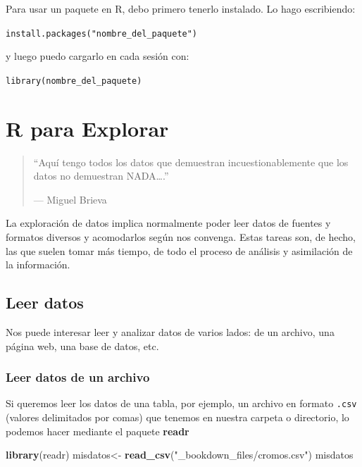 \documentclass[]{book}
\newenvironment{Shaded}{\begin{snugshade}}{\end{snugshade}}
\newcommand{\KeywordTok}[1]{\textcolor[rgb]{0.13,0.29,0.53}{\textbf{{#1}}}}
\newcommand{\StringTok}[1]{\textcolor[rgb]{0.31,0.60,0.02}{{#1}}}
\newcommand{\NormalTok}[1]{{#1}}
\theoremstyle{definition}
\theoremstyle{definition}
\theoremstyle{remark}
\begin{document}
Para usar un paquete en R, debo primero tenerlo instalado. Lo hago
escribiendo:

\texttt{install.packages("nombre\_del\_paquete")}

y luego puedo cargarlo en cada sesión con:

\texttt{library(nombre\_del\_paquete)}

\chapter{R para Explorar}\label{r-para-explorar}

\begin{quote}
``Aquí tengo todos los datos que demuestran incuestionablemente que los
datos no demuestran NADA\ldots{}.''

--- Miguel Brieva
\end{quote}

La exploración de datos implica normalmente poder leer datos de fuentes
y formatos diversos y acomodarlos según nos convenga. Estas tareas son,
de hecho, las que suelen tomar más tiempo, de todo el proceso de
análisis y asimilación de la información.

\section{Leer datos}\label{leer-datos}

Nos puede interesar leer y analizar datos de varios lados: de un
archivo, una página web, una base de datos, etc.

\subsection{Leer datos de un archivo}\label{leer-datos-de-un-archivo}

Si queremos leer los datos de una tabla, por ejemplo, un archivo en
formato \texttt{.csv} (valores delimitados por comas) que tenemos en
nuestra carpeta o directorio, lo podemos hacer mediante el paquete
\textbf{readr} \citep{R-readr}

\begin{Shaded}
\begin{Highlighting}[]
\KeywordTok{library}\NormalTok{(readr)}
\NormalTok{misdatos<-}\StringTok{ }\KeywordTok{read_csv}\NormalTok{(}\StringTok{"_bookdown_files/cromos.csv"}\NormalTok{)}
\NormalTok{misdatos}
\end{Highlighting}
\end{Shaded}
\end{document}
